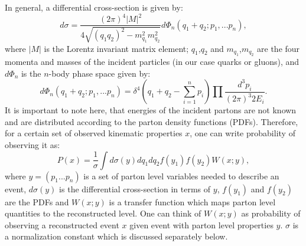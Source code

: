 \documentclass{cmspaper}
\begin{document}
In general, a differential cross-section is given by:
\begin{equation}
d\sigma=\frac{(2\pi)^{4} \left| M \right|^{2}}{4\sqrt{(q_{1}q_{2})^{2}-m_{q_{1}}^{2}m_{q_{2}}^{2}}}d\Phi_{n}(q_{1}+q_{2};p_{1},...p_{n}),
\label{eqn:DiffXsecGeneral}  
\end{equation}
where $\left| M \right|$ is the Lorentz invariant matrix element; $q_{1}$,$q_{2}$ and $m_{q_{1}}$,$m_{q_{2}}$ are the four momenta and masses
of the incident particles (in our case quarks or gluons), and $d\Phi_{n}$ is the $n$-body phase space given by:
\begin{equation}
d\Phi_{n}(q_{1}+q_{2};p_{1},...p_{n})=\delta^{4}(q_{1}+q_{2}-\sum_{i=1}^{n}{p_{i}})\prod\frac{d^{3}p_{i}}{(2\pi)^{3}2E_{i}}.
\label{eqn:PhaseSpaceGeneral}  
\end{equation}
It is important to note here, that energies of the incident partons are not known and are distributed according to the parton density 
functions (PDFs). Therefore, for a certain set of observed kinematic properties $x$, one can write probability of observing it as:
\begin{equation}
P(x)=\frac{1}{\sigma}\int d\sigma(y)dq_{1}dq_{2}f(y_{1})f(y_{2})W(x;y),
\label{eqn:EvtProbGeneral}  
\end{equation}
where $y=(p_{1}...p_{n})$ is a set of parton level variables needed to describe an event, $d\sigma(y)$ is the differential cross-section 
in terms of $y$, $f(y_{1})$ and $f(y_{2})$ are the PDFs and $W(x;y)$ is a transfer function which maps parton level quantities to the reconstructed level. One can think of $W(x;y)$ as probability of observing a reconstructed event $x$ given event with parton level properties $y$. $\sigma$ is a normalization constant which is discussed separately below.
\end{document}
